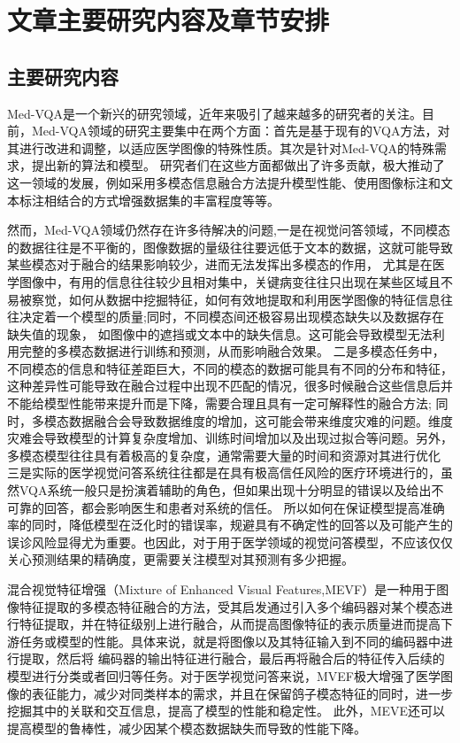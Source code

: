 \section{文章主要研究内容及章节安排}
\subsection{主要研究内容}
Med-VQA是一个新兴的研究领域，近年来吸引了越来越多的研究者的关注。目前，Med-VQA领域的研究主要集中在两个方面：首先是基于现有的VQA方法，对其进行改进和调整，以适应医学图像的特殊性质。其次是针对Med-VQA的特殊需求，提出新的算法和模型。
研究者们在这些方面都做出了许多贡献，极大推动了这一领域的发展，例如采用多模态信息融合方法提升模型性能、使用图像标注和文本标注相结合的方式增强数据集的丰富程度等等。

然而，Med-VQA领域仍然存在许多待解决的问题,一是在视觉问答领域，不同模态的数据往往是不平衡的，图像数据的量级往往要远低于文本的数据，这就可能导致某些模态对于融合的结果影响较少，进而无法发挥出多模态的作用，
尤其是在医学图像中，有用的信息往往较少且相对集中，关键病变往往只出现在某些区域且不易被察觉，如何从数据中挖掘特征，如何有效地提取和利用医学图像的特征信息往往决定着一个模型的质量;同时，不同模态间还极容易出现模态缺失以及数据存在缺失值的现象，
如图像中的遮挡或文本中的缺失信息。这可能会导致模型无法利用完整的多模态数据进行训练和预测，从而影响融合效果。
二是多模态任务中，不同模态的信息和特征差距巨大，不同的模态的数据可能具有不同的分布和特征，这种差异性可能导致在融合过程中出现不匹配的情况，很多时候融合这些信息后并不能给模型性能带来提升而是下降，需要合理且具有一定可解释性的融合方法\cite{huang2021makes};
同时，多模态数据融合会导致数据维度的增加，这可能会带来维度灾难的问题。维度灾难会导致模型的计算复杂度增加、训练时间增加以及出现过拟合等问题。另外，多模态模型往往具有着极高的复杂度，通常需要大量的时间和资源对其进行优化
三是实际的医学视觉问答系统往往都是在具有极高信任风险的医疗环境进行的，虽然VQA系统一般只是扮演着辅助的角色，但如果出现十分明显的错误以及给出不可靠的回答，都会影响医生和患者对系统的信任。
所以如何在保证模型提高准确率的同时，降低模型在泛化时的错误率，规避具有不确定性的回答以及可能产生的误诊风险显得尤为重要。也因此，对于用于医学领域的视觉问答模型，不应该仅仅关心预测结果的精确度，更需要关注模型对其预测有多少把握。

混合视觉特征增强（Mixture of Enhanced Visual Features,MEVF）是一种用于图像特征提取的多模态特征融合的方法，受其启发通过引入多个编码器对某个模态进行特征提取，并在特征级别上进行融合，从而提高图像特征的表示质量进而提高下游任务或模型的性能。具体来说，就是将图像以及其特征输入到不同的编码器中进行提取，然后将
编码器的输出特征进行融合，最后再将融合后的特征传入后续的模型进行分类或者回归等任务。对于医学视觉问答来说，MVEF极大增强了医学图像的表征能力，减少对同类样本的需求，并且在保留鸽子模态特征的同时，进一步挖掘其中的关联和交互信息，提高了模型的性能和稳定性。
此外，MEVE还可以提高模型的鲁棒性，减少因某个模态数据缺失而导致的性能下降。

